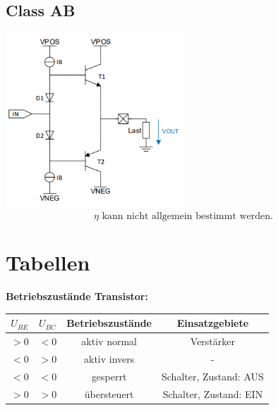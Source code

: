 \documentclass[margin=normal]{tex/hsrzf}
\begin{document}
\begin{minipage}{0.33\textwidth}
  \subsection*{Class AB}
  \includegraphics[width = 0.5\textwidth]{img/Verstärker/ClassABVerstärker.png}
  $$\eta \textrm{ kann nicht allgemein bestimmt werden.}$$
\end{minipage}%

\section*{Tabellen}
\textbf{Betriebszustände Transistor:}\\
\begin{tabular}{|c|c|c|c|}
  \hline
  $U_{BE}$ & $U_{BC}$ & Betriebszustände & Einsatzgebiete         \\
  \hline
  $>0$     & $<0$     & aktiv normal     & Verstärker             \\
  \hline
  $<0$     & $>0$     & aktiv invers     & -                      \\
  \hline
  $<0$     & $<0$     & gesperrt         & Schalter, Zustand: AUS \\
  \hline
  $>0$     & $>0$     & übersteuert      & Schalter, Zustand: EIN \\
  \hline
\end{tabular}
\\
\end{document}
